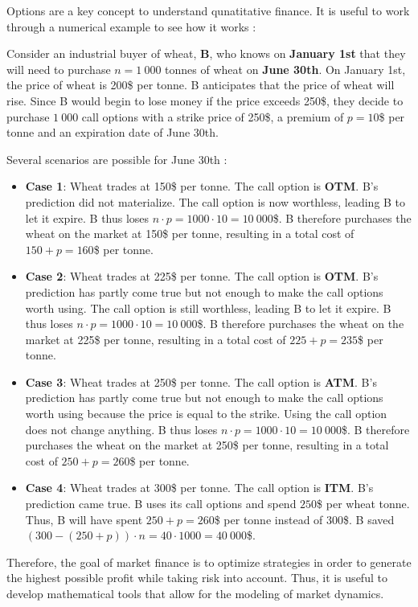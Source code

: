 \newpage

Options are a key concept to understand qunatitative finance.
It is useful to work through a numerical example to see how it works : 

Consider an industrial buyer of wheat, \textbf{B}, who knows on \textbf{January 1st} that they will need to purchase $n = 1\:000$ tonnes of wheat on \textbf{June 30th}.
On January 1st, the price of wheat is 200\$ per tonne. 
B anticipates that the price of wheat will rise. 
Since B would begin to lose money if the price exceeds 250\$, they decide to purchase $1\:000$ call options with a strike price of 250\$, a premium of $p=10$\$ per tonne and an expiration date of June 30th.

Several scenarios are possible for June 30th : 
\begin{itemize}
    \item \textbf{Case 1}: Wheat trades at 150\$ per tonne.
    The call option is \textbf{OTM}.
    B's prediction did not materialize.
    The call option is now worthless, leading B to let it expire.
    B thus loses $n \cdot p = 1000 \cdot10 = 10\:000$\$.
    B therefore purchases the wheat on the market at 150\$ per tonne, resulting in a total cost of $150 + p = 160$\$ per tonne.

    \item \textbf{Case 2}: Wheat trades at 225\$ per tonne.
    The call option is \textbf{OTM}.
    B's prediction has partly come true but not enough to make the call options worth using.
    The call option is still worthless, leading B to let it expire.
    B thus loses $n \cdot p = 1000 \cdot10 = 10\:000$\$.
    B therefore purchases the wheat on the market at 225\$ per tonne, resulting in a total cost of $225+p=235$\$ per tonne.

    \item \textbf{Case 3}: Wheat trades at 250\$ per tonne.
    The call option is \textbf{ATM}.
    B's prediction has partly come true but not enough to make the call options worth using because the price is equal to the strike.
    Using the call option does not change anything.
    B thus loses $n \cdot p = 1000 \cdot10 = 10\:000$\$.
    B therefore purchases the wheat on the market at 250\$ per tonne, resulting in a total cost of $250 + p = 260$\$ per tonne.
    
    \item \textbf{Case 4}: Wheat trades at 300\$ per tonne.
    The call option is \textbf{ITM}.
    B's prediction came true.
    B uses its call options and spend $250$\$ per wheat tonne.
    Thus, B will have spent $250 + p = 260$\$ per tonne instead of 300\$.
    B saved $(300-(250+p))\cdot n = 40 \cdot 1000 = 40\:000$\$. \\   
  

\end{itemize}
Therefore, the goal of market finance is to optimize strategies in order to generate the highest possible profit while taking risk into account. 
Thus, it is useful to develop mathematical tools that allow for the modeling of market dynamics.

